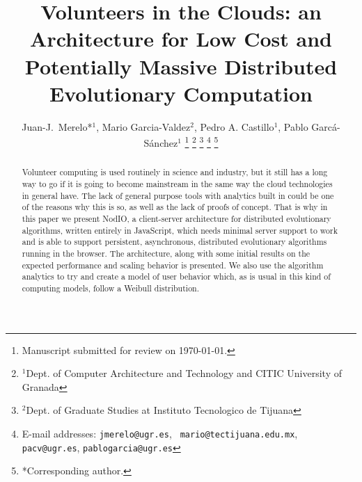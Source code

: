 \documentclass[journal,onecolumn]{IEEEtran}
\begin{document}
\title{Volunteers in the Clouds: an Architecture for Low Cost and Potentially Massive Distributed Evolutionary Computation}
%
%
%





\author{Juan-J.~Merelo*$^1$, Mario Garcia-Valdez$^2$, Pedro A. Castillo$^1$, Pablo Garc\'a-S\'anchez$^1$
\thanks{Manuscript submitted for review on \today.}%
\thanks{$^1$Dept. of Computer Architecture and Technology and CITIC University of Granada}%
\thanks{$^2$Dept. of Graduate Studies at Instituto Tecnologico de Tijuana}%
\thanks{E-mail addresses: {\tt jmerelo@ugr.es}, {\tt
    mario@tectijuana.edu.mx}, {\tt pacv@ugr.es}, {\tt pablogarcia@ugr.es}}%
\thanks{*Corresponding author.}%
}

\maketitle

\begin{abstract}
Volunteer computing is used routinely in science and industry, but it
still has a long way to go if it is going to become mainstream in the
same way the cloud technologies in general have. The lack of general purpose tools
with analytics built in could be one of the reasons why this is so, as
well as the lack of proofs of concept. That is why in this paper we
present NodIO, a client-server architecture for distributed
evolutionary algorithms, written entirely in JavaScript, which needs
minimal server support to work and is able to support persistent,
asynchronous, distributed evolutionary algorithms running in the
browser. The architecture, along with some initial results on the expected performance and scaling
behavior is presented. We also use the algorithm analytics to try and  %
create a model of user behavior which, as is usual in this kind of
computing models, follow a Weibull distribution. 
\end{abstract}
\end{document}
